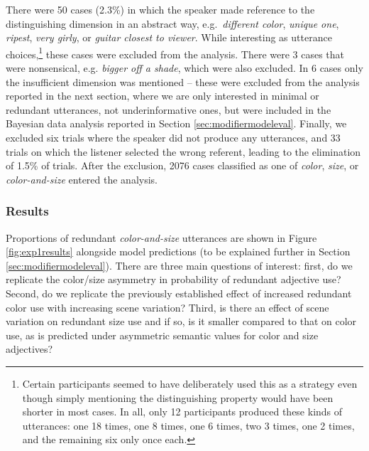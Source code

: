 \documentclass[11pt]{article}
\newcommand{\figref}[1]{Figure \ref{#1}}
\newcommand{\sectionref}[1]{Section \ref{#1}}
\begin{document}
There were 50 cases (2.3\%) in which the speaker made reference to the distinguishing dimension in an abstract way, e.g.~\emph{different color}, \emph{unique one}, \emph{ripest}, \emph{very girly}, or \emph{guitar closest to viewer}. While interesting as utterance choices,\footnote{Certain participants seemed to have deliberately used this as a strategy even though simply mentioning the distinguishing property would have been shorter in most cases. In all, only 12 participants produced these kinds of utterances: one 18 times, one 8 times, one 6 times, two 3 times, one 2 times, and the remaining six only once each.} these cases were excluded from the analysis. There were 3 cases that were nonsensical, e.g. \emph{bigger off a shade}, which were also excluded. In 6 cases only the insufficient dimension was mentioned -- these were excluded from the analysis reported in the next section, where we are only interested in minimal or redundant utterances, not underinformative ones, but were included in the Bayesian data analysis reported in \sectionref{sec:modifiermodeleval}. Finally, we excluded six trials where the speaker did not produce any utterances, and 33 trials on which the listener selected the wrong referent, leading to the elimination of 1.5\% of trials. After the exclusion, 2076 cases classified as one of \emph{color}, \emph{size}, or \emph{color-and-size} entered the analysis. 

\subsubsection{Results}
\label{sec:modelempiricalresults}

Proportions of redundant \emph{color-and-size} utterances are shown in \figref{fig:exp1results} alongside model predictions (to be explained further in \sectionref{sec:modifiermodeleval}). There are three main questions of interest: first, do we replicate the color/size asymmetry in probability of redundant adjective use? Second, do we replicate the previously established effect of increased redundant color use with increasing scene variation? Third, is there an effect of scene variation on redundant size use and if so, is it smaller compared to that on color use, as is predicted under asymmetric semantic values for color and size adjectives?
\end{document}
